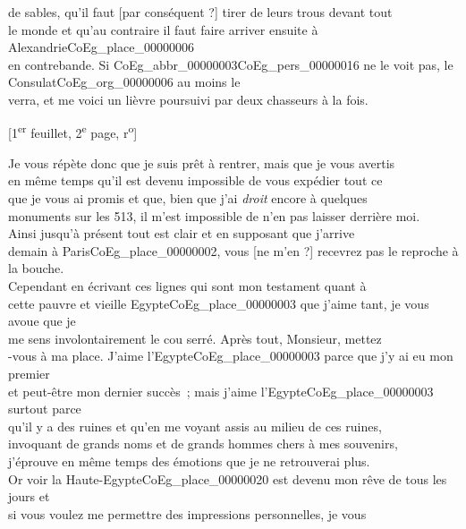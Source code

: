 \documentclass{book}
\begin{document}
de sables, qu’il faut {[par conséquent ?]} tirer de leurs trous devant tout\\
le monde et qu’au contraire il faut faire arriver ensuite à Alexandrie\gls{CoEg_place_00000006}\\
en contrebande. Si \gls{CoEg_abbr_00000003}\gls{CoEg_pers_00000016} ne le voit pas, le Consulat\gls{CoEg_org_00000006} au moins le\\
verra, et me voici un lièvre poursuivi par deux chasseurs à la fois.
{\footnotesize\begin{center} {[1\textsuperscript{er} feuillet, 2\textsuperscript{e} page, r\textsuperscript{o}]}\end{center}}
\indent Je vous répète donc que je suis prêt à rentrer, mais que je vous avertis\\
en même temps qu’il est devenu impossible de vous expédier tout ce\\
que je vous ai promis et que, bien que j’ai \textit{droit} encore à quelques\\
monuments sur les 513, il m’est impossible de n’en pas laisser derrière moi.\\
\indent Ainsi jusqu’à présent tout est clair et en supposant que j’arrive\\
demain à Paris\gls{CoEg_place_00000002}, vous {[ne m’en ?]} recevrez pas le reproche à la bouche.\\
\indent Cependant en écrivant ces lignes qui sont mon testament quant à\\
cette pauvre et vieille Egypte\gls{CoEg_place_00000003} que j’aime tant, je vous avoue que je\\
me sens involontairement le cou serré. Après tout, Monsieur, mettez\\
-vous à ma place. J’aime l’Egypte\gls{CoEg_place_00000003} parce que j’y ai eu mon premier\\
et peut-être mon dernier succès~; mais j’aime l’Egypte\gls{CoEg_place_00000003} surtout parce\\
qu’il y a des ruines et qu’en me voyant assis au milieu de ces ruines,\\
invoquant de grands noms et de grands hommes chers à mes souvenirs,\\
j’éprouve en même temps des émotions que je ne retrouverai plus.\\
Or voir la Haute-Egypte\gls{CoEg_place_00000020} est devenu mon rêve de tous les jours et\\
si vous voulez me permettre des impressions personnelles, je vous\\
\end{document}
